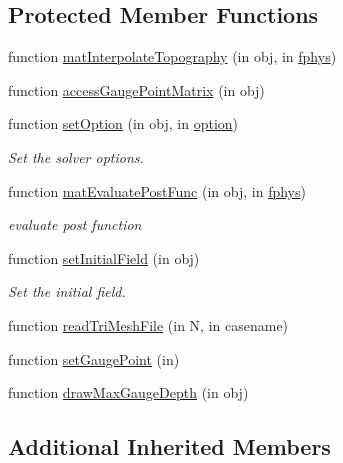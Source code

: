 \subsection*{Protected Member Functions}
\begin{DoxyCompactItemize}
\item 
function \hyperlink{class_malpasset2d_a3107faa96550eed8786175bc44705f74}{mat\+Interpolate\+Topography} (in obj, in \hyperlink{class_ndg_phys_a6b25724fc9474d32018439009072f0a9}{fphys})
\item 
function \hyperlink{class_malpasset2d_a0229b8ea28b363cec349cdaf55f9ac3d}{access\+Gauge\+Point\+Matrix} (in obj)
\item 
function \hyperlink{class_malpasset2d_a3cc5af4a9d51c552103329284cef6391}{set\+Option} (in obj, in \hyperlink{class_ndg_phys_af91f4c54b93504e76b38a5693774dff1}{option})
\begin{DoxyCompactList}\small\item\em Set the solver options. \end{DoxyCompactList}\item 
function \hyperlink{class_malpasset2d_a69869bfecba889300e815dd8c59586e6}{mat\+Evaluate\+Post\+Func} (in obj, in \hyperlink{class_ndg_phys_a6b25724fc9474d32018439009072f0a9}{fphys})
\begin{DoxyCompactList}\small\item\em evaluate post function \end{DoxyCompactList}\item 
function \hyperlink{class_malpasset2d_a5b734a50ffc13d7504f12539e21d102e}{set\+Initial\+Field} (in obj)
\begin{DoxyCompactList}\small\item\em Set the initial field. \end{DoxyCompactList}\item 
function \hyperlink{class_malpasset2d_af1a60c8ceb3a128fe0d48825a918b7f3}{read\+Tri\+Mesh\+File} (in N, in casename)
\item 
function \hyperlink{class_malpasset2d_aab7422aec9fbd28e9ff6dffaee80fd4b}{set\+Gauge\+Point} (in)
\item 
function \hyperlink{class_malpasset2d_ab35bfbc4844c80b57762557d061b03da}{draw\+Max\+Gauge\+Depth} (in obj)
\end{DoxyCompactItemize}
\subsection*{Additional Inherited Members}


